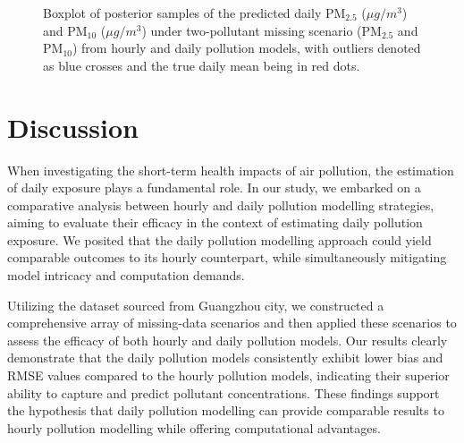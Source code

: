 \documentclass[
  12,
]{article}
\begin{document}
\begin{figure}[H]
\caption{Boxplot of posterior samples of the predicted daily PM$_{2.5}$ ($\mu g/m^3$) and PM$_{10}$ ($\mu g/m^3$) under two-pollutant missing scenario (PM$_{2.5}$ and PM$_{10}$) from hourly and daily pollution models, with outliers denoted as blue crosses and the true daily mean being in red dots.}\label{fig:pm25pm10missing}
\end{figure}

\hypertarget{discussion}{%
\section{Discussion}\label{discussion}}

When investigating the short-term health impacts of air pollution, the
estimation of daily exposure plays a fundamental role. In our study, we
embarked on a comparative analysis between hourly and daily pollution
modelling strategies, aiming to evaluate their efficacy in the context
of estimating daily pollution exposure. We posited that the daily
pollution modelling approach could yield comparable outcomes to its
hourly counterpart, while simultaneously mitigating model intricacy and
computation demands.

Utilizing the dataset sourced from Guangzhou city, we constructed a
comprehensive array of missing-data scenarios and then applied these
scenarios to assess the efficacy of both hourly and daily pollution
models. Our results clearly demonstrate that the daily pollution models
consistently exhibit lower bias and RMSE values compared to the hourly
pollution models, indicating their superior ability to capture and
predict pollutant concentrations. These findings support the hypothesis
that daily pollution modelling can provide comparable results to hourly
pollution modelling while offering computational advantages. 
\end{document}
